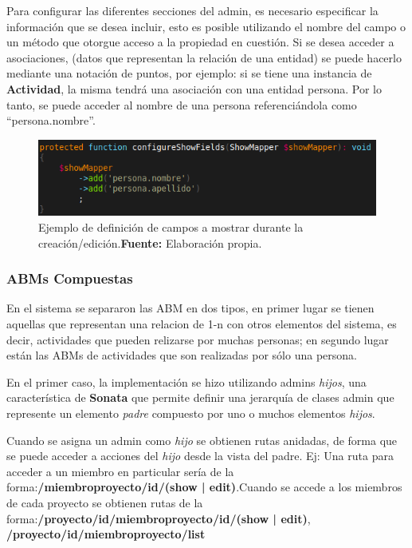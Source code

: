 Para configurar las diferentes secciones del admin, es necesario especificar la información que se desea incluir, esto es posible utilizando el nombre del campo
o un método que otorgue acceso a la propiedad en cuestión\@. Si se desea acceder a asociaciones, (datos que representan la relación de una entidad) se puede hacerlo mediante una notación de puntos, por ejemplo:
si se tiene una instancia de \textbf{Actividad}, la misma tendrá una asociación con una entidad persona\@. Por lo tanto, se puede acceder al nombre de una
persona referenciándola como ``persona.nombre''.
\begin{figure}[h]
    \includegraphics[width=1\linewidth]{image/show.png}
    \caption{Ejemplo de definición de campos a mostrar durante la creación/edición.\newline \textbf{Fuente:} Elaboración propia.}
    \label{fig:image/show}
\end{figure}


\subsubsection{ABMs Compuestas}%
\label{ssub:admin_proyectadmin_proyecto}

En el sistema se separaron las ABM en dos tipos, en primer lugar se tienen aquellas que representan una relacion de 1-n con otros elementos del sistema,
es decir, actividades que pueden relizarse por muchas personas; en segundo lugar están las ABMs de actividades que son realizadas por sólo una persona.


En el primer caso, la implementación se hizo utilizando admins \textit{hijos}, una característica de \textbf{Sonata} que permite definir una jerarquía de clases admin que represente un
elemento \textit{padre} compuesto por uno o muchos elementos \textit{hijos}.

Cuando se asigna un admin como \textit{hijo} se obtienen rutas anidadas, de forma que se puede acceder a acciones del \textit{hijo} desde la vista del padre.
Ej: Una ruta
para acceder a un miembro en particular sería de la forma:\newline \textbf{/miembroproyecto/{id}/(show | edit)}\@.\newline\newline Cuando se accede a los
miembros de cada proyecto se obtienen rutas de la forma:\newline \textbf{/proyecto/{id}/miembroproyecto/{id}/(show | edit)},
\newline \textbf{/proyecto/{id}/miembroproyecto/list}\newline


